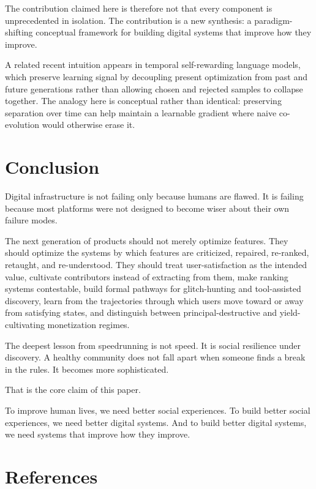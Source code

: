\documentclass[11pt]{article}
\begin{document}
The contribution claimed here is therefore not that every component is unprecedented in isolation. The contribution is a new synthesis: a paradigm-shifting conceptual framework for building digital systems that improve how they improve.

A related recent intuition appears in temporal self-rewarding language models, which preserve learning signal by decoupling present optimization from past and future generations rather than allowing chosen and rejected samples to collapse together. The analogy here is conceptual rather than identical: preserving separation over time can help maintain a learnable gradient where naive co-evolution would otherwise erase it.

\section{Conclusion}

Digital infrastructure is not failing only because humans are flawed. It is failing because most platforms were not designed to become wiser about their own failure modes.

The next generation of products should not merely optimize features. They should optimize the systems by which features are criticized, repaired, re-ranked, retaught, and re-understood. They should treat user-satisfaction as the intended value, cultivate contributors instead of extracting from them, make ranking systems contestable, build formal pathways for glitch-hunting and tool-assisted discovery, learn from the trajectories through which users move toward or away from satisfying states, and distinguish between principal-destructive and yield-cultivating monetization regimes.

The deepest lesson from speedrunning is not speed. It is social resilience under discovery. A healthy community does not fall apart when someone finds a break in the rules. It becomes more sophisticated.

That is the core claim of this paper.

To improve human lives, we need better social experiences. To build better social experiences, we need better digital systems. And to build better digital systems, we need systems that improve how they improve.

\section*{References}
\end{document}
